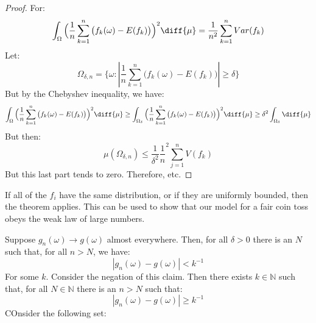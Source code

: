    \begin{proof}
        For:
        \begin{equation}
            \int_{\Omega}\Big(\frac{1}{n}\sum_{k=1}^{n}\big(
                f_{k}(\omega)-E(f_{k})\big)\Big)^{2}\diff{\mu}
            =\frac{1}{n^{2}}\sum_{k=1}^{n}Var(f_{k})
        \end{equation}
        Let:
        \begin{equation}
            \Omega_{\delta,n}=
            \{\omega:|\frac{1}{n}\sum_{k=1}^{n}
                \big(f_{k}(\omega)-E(f_{k})\big)|\geq\delta\}
        \end{equation}
        But by the Chebyshev inequality, we have:
        \begin{equation}
            \int_{\Omega}\Big(\frac{1}{n}\sum_{k=1}^{n}\big(
                f_{k}(\omega)-E(f_{k})\big)\Big)^{2}\diff{\mu}
            \geq\int_{\Omega_{\delta}}
                \Big(\frac{1}{n}\sum_{k=1}^{n}\big(
                f_{k}(\omega)-E(f_{k})\big)\Big)^{2}\diff{\mu}
            \geq\delta^{2}\int_{\Omega_{\delta}}\diff{\mu}
        \end{equation}
        But then:
        \begin{equation}
            \mu(\Omega_{\delta,n})\leq
            \frac{1}{\delta^{2}}\frac{1}{n}^{2}
            \sum_{j=1}^{n}V(f_{k})
        \end{equation}
        But this last part tends to zero. Therefore, etc.
    \end{proof}
    \begin{lexample}
        If all of the $f_{i}$ have the same distribution, or
        if they are uniformly bounded, then the theorem applies.
        This can be used to show that our model for a fair
        coin toss obeys the weak law of large numbers.
    \end{lexample}
    Suppose $g_{n}(\omega)\rightarrow{g}(\omega)$ almost
    everywhere. Then, for all $\delta>0$ there is an
    $N$ such that, for all $n>N$, we have:
    \begin{equation}
        |g_{n}(\omega)-g(\omega)|<k^{\minus{1}}
    \end{equation}
    For some $k$. Consider the negation of this claim. Then
    there exists $k\in\mathbb{N}$ such that, for all
    $N\in\mathbb{N}$ there is an $n>N$ such that:
    \begin{equation}
        |g_{n}(\omega)-g(\omega)|\geq{k}^{\minus{1}}
    \end{equation}
    COnsider the following set:

